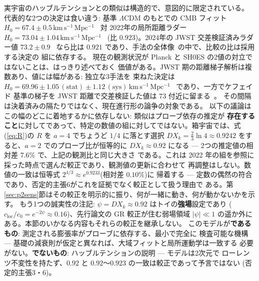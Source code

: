 \documentclass[a4paper,10pt,twocolumn]{ltjsarticle}
\begin{document}
実宇宙のハッブルテンションとの類似は構造的で、意図的に限定されている。
代表的な2つの決定は食い違う: 基準 $\Lambda$CDM のもとでの CMB フィット
$H_0=67.4\pm0.5\,\mathrm{km\,s^{-1}\,Mpc^{-1}}$~\cite{Planck2018} 対
2022年の局所距離ラダー $H_0=73.04\pm1.04\,\mathrm{km\,s^{-1}\,Mpc^{-1}}$~\cite{Riess2022}
(比 $0.923$)。2024年の JWST 交差検証済みラダー値 $73.2\pm0.9$~\cite{Riess2024} なら比は
$0.921$ であり、手法の全体像~\cite{DiValentino2021}の中で、比較の比は採用する決定の
組に依存する。
現在の観測状況が Planck と SH0ES の2値の対立ではないことは、はっきり述べておく
価値がある。JWST 期の距離梯子解析は複数あり、値には幅がある: 独立な3手法を
束ねた決定は
$H_0=69.96\pm1.05\,(\mathrm{stat})\pm1.12\,(\mathrm{sys})
\,\mathrm{km\,s^{-1}\,Mpc^{-1}}$~\cite{Freedman2024} であり、一方でケフェイド
基準の梯子を JWST 距離で交差検証した値は $73$ 付近に留まる~\cite{Riess2024}。
その間隔は決着済みの隔たりではなく、現在進行形の論争の対象である。
以下の議論はこの幅のどこに着地するかに依存しない: 類似はプローブ依存の推定が
\textbf{存在すること}に対してであって、特定の数値の組に対してではない。箱宇宙では、式(\ref{eq:R})の $R$ を $a=4$ でちょうど $1/4$ に落とす選択
$D X_k=\tfrac{2}{3}\ln 4\approx 0.9242$ をすると、$a=2$ でのプローブ比が恒等的に
$D X_k\approx0.92$ になる --- 2つの推定値の相対差 $7.6\%$ で、上記の観測比と同じ大きさ
である。これは 2022 年の組を参照に採った時点で選んだ較正であり、観測値の更新に合わせて
再調整はしない。数値の一致は恒等式 $2^{4/3}\approx e^{0.9233}$(相対差 $0.10\%$)に
帰着する --- 定数の偶然の符合であり、否定的主張6がこれを証拠でなく較正として扱う理由で
ある。第\ref{sec:p2sens}節はその較正を明示的に振り、何が一緒に動き、何が動かないかを示す。
もう1つの誠実性の注記: $\psi=D X_k\approx0.92$ はトイの\textbf{強場}設定であり
($c_{\mathrm{loc}}/c_0=e^{-2\psi}\approx0.16$)、先行論文の GR 較正が住む弱場領域
$|\psi|\ll1$ の遥か外にある。本節のいかなる内容もそれらの較正を継承しない。
このモデルが\textbf{であるもの}: 測定される膨張率がプローブに依存する、最小で完全に
検査可能な機構 --- 基礎の減衰則が仮定と異なれば、大域フィットと局所運動学は一致する
必要がない。\textbf{でないもの}: ハッブルテンションの説明 --- モデルは2次元で
ローレンツ不変性を持たず、$0.92$ と $0.92$〜$0.923$ の一致は較正であって予言ではない
(否定的主張3・6)。

\end{document}
